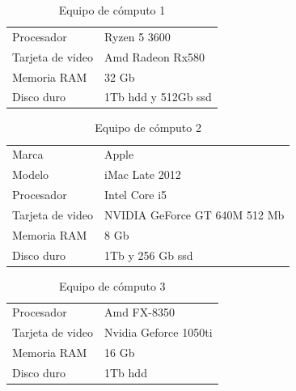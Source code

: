\documentclass[12pt, a4paper, titlepage]{report}
\begin{document}
        \begin{table}[H]
	    	\begin{tabular}{|p{3.5cm}||p{10cm}|}
	    		\rowcolor{guindapoli}
	    		\multicolumn{2}{|c|}{\textbf{\textcolor{white}{Equipo de cómputo utilizado. [1]}}}\\
	    		\hline
	    		\rowcolor{azulclaro}Procesador & Ryzen 5 3600\\
	    		\hline
	    		\rowcolor{white}Tarjeta de video & Amd Radeon Rx580\\
	    		\hline
	    		\rowcolor{azulclaro}Memoria RAM & 32 Gb\\
	    		\hline
	    		\rowcolor{white}Disco duro & 1Tb \acrshort{hdd} y 512Gb \acrshort{ssd}\\
	    		\hline
	    	\end{tabular}
    	\caption[Equipo de cómputo 1]{Equipo de cómputo 1}
   	  \end{table}
      \begin{table}[H]
	    	\begin{tabular}{|p{3.5cm}||p{10cm}|}
	    		\rowcolor{guindapoli}
	    		\multicolumn{2}{|c|}{\textbf{\textcolor{white}{Equipo de cómputo utilizado. [2]}}}\\
	    		\hline
	    		\rowcolor{azulclaro}Marca & Apple\\
	    		\hline
	    		\rowcolor{white}Modelo & iMac Late 2012\\
	    		\hline
	    		\rowcolor{azulclaro}Procesador & Intel Core i5\\
	    		\hline
	    		\rowcolor{white}Tarjeta de video & NVIDIA GeForce GT 640M 512 Mb\\
	    		\hline
	    		\rowcolor{azulclaro}Memoria RAM & 8 Gb\\
	    		\hline
	    		\rowcolor{white}Disco duro & 1Tb y 256 Gb \acrshort{ssd}\\
	    		\hline
	    	\end{tabular}
    	\caption[Equipo de cómputo 2]{Equipo de cómputo 2}
    \end{table}
    \begin{table}[H]
			\begin{tabular}{|p{3.5cm}||p{10cm}|}
				\rowcolor{guindapoli}
				\multicolumn{2}{|c|}{\textbf{\textcolor{white}{Equipo de cómputo utilizado. [3]}}}\\
				\hline
				\rowcolor{azulclaro}Procesador & Amd FX-8350\\
				\hline
				\rowcolor{white}Tarjeta de video & Nvidia Geforce 1050ti\\
				\hline
				\rowcolor{azulclaro}Memoria RAM & 16 Gb\\
				\hline
				\rowcolor{white}Disco duro & 1Tb \acrshort{hdd}\\
				\hline
			\end{tabular}
		\caption[Equipo de cómputo 3]{Equipo de cómputo 3}
   \end{table}
\end{document}
